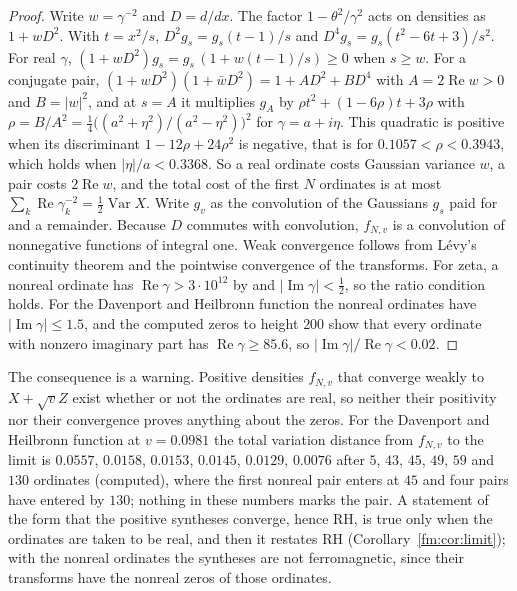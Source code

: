 \begin{proof}
Write $w=\gamma^{-2}$ and $D=d/dx$. The factor $1-\theta^2/\gamma^2$ acts on densities as $1+wD^2$. With $t=x^2/s$, $D^2g_s=g_s(t-1)/s$ and $D^4g_s=g_s(t^2-6t+3)/s^2$. For real $\gamma$, $(1+wD^2)g_s=g_s\,(1+w(t-1)/s)\ge0$ when $s\ge w$. For a conjugate pair, $(1+wD^2)(1+\bar wD^2)=1+AD^2+BD^4$ with $A=2\operatorname{Re}w>0$ and $B=|w|^2$, and at $s=A$ it multiplies $g_A$ by $\rho t^2+(1-6\rho)t+3\rho$ with $\rho=B/A^2=\frac14\big((a^2+\eta^2)/(a^2-\eta^2)\big)^2$ for $\gamma=a+i\eta$. This quadratic is positive when its discriminant $1-12\rho+24\rho^2$ is negative, that is for $0.1057<\rho<0.3943$, which holds when $|\eta|/a<0.3368$. So a real ordinate costs Gaussian variance $w$, a pair costs $2\operatorname{Re}w$, and the total cost of the first $N$ ordinates is at most $\sum_k\operatorname{Re}\gamma_k^{-2}=\frac12\operatorname{Var}X$. Write $g_v$ as the convolution of the Gaussians $g_s$ paid for and a remainder. Because $D$ commutes with convolution, $f_{N,v}$ is a convolution of nonnegative functions of integral one. Weak convergence follows from L\'evy's continuity theorem and the pointwise convergence of the transforms. For zeta, a nonreal ordinate has $\operatorname{Re}\gamma>3\cdot10^{12}$ by \cite{PT21} and $|\operatorname{Im}\gamma|<\frac12$, so the ratio condition holds. For the Davenport and Heilbronn function the nonreal ordinates have $|\operatorname{Im}\gamma|\le1.5$, and the computed zeros to height $200$ show that every ordinate with nonzero imaginary part has $\operatorname{Re}\gamma\ge85.6$, so $|\operatorname{Im}\gamma|/\operatorname{Re}\gamma<0.02$.
\end{proof}

The consequence is a warning. Positive densities $f_{N,v}$ that converge weakly to $X+\sqrt vZ$ exist whether or not the ordinates are real, so neither their positivity nor their convergence proves anything about the zeros. For the Davenport and Heilbronn function at $v=0.0981$ the total variation distance from $f_{N,v}$ to the limit is $0.0557$, $0.0158$, $0.0153$, $0.0145$, $0.0129$, $0.0076$ after $5$, $43$, $45$, $49$, $59$ and $130$ ordinates (computed), where the first nonreal pair enters at $45$ and four pairs have entered by $130$; nothing in these numbers marks the pair. A statement of the form that the positive syntheses converge, hence RH, is true only when the ordinates are taken to be real, and then it restates RH (Corollary~\ref{fm:cor:limit}); with the nonreal ordinates the syntheses are not ferromagnetic, since their transforms have the nonreal zeros of those ordinates.

